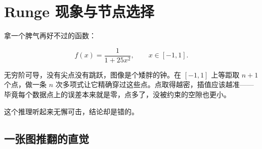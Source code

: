\section{Runge 现象与节点选择}
\label{sec:08-Numerical-Analysis/03-Interpolation-and-Approximation/02}

拿一个脾气再好不过的函数：

\[
f(x)=\frac{1}{1+25x^2},\qquad x\in[-1,1].
\]

无穷阶可导，没有尖点没有跳跃，图像是个矮胖的钟。在 \([-1,1]\) 上等距取 \(n+1\) 个点，做一条 \(n\) 次多项式让它精确穿过这些点。点取得越密，插值应该越准——毕竟每个数据点上的误差本来就是零，点多了，没被约束的空隙也更小。

这个推理听起来无懈可击，结论却是错的。

\subsection{一张图推翻的直觉}

